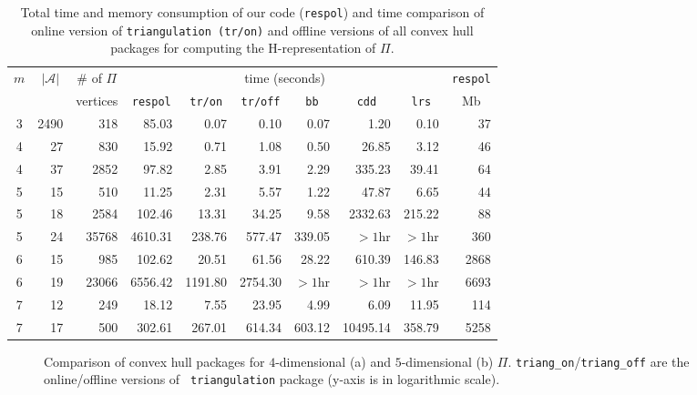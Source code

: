 \documentclass{article}
\def\A{{\mathcal A}} \def\R{{\mathcal R}}
\begin{document}
\begin{table*}[t]\footnotesize \centering
\begin{tabular}{@{}crr|rr|rrrr|r}
\multirow{2}{*}{$m$} & 
\multicolumn{1}{c}{\multirow{2}{*}{$|\A|$}} &
\multicolumn{1}{c|}{\# of $\varPi$} &
\multicolumn{6}{c|}{time (seconds)} &
\multicolumn{1}{c}{{\tt respol}} \\
\cline{4-9} & &
\multicolumn{1}{c|}{vertices} &
\multicolumn{1}{c}{{\tt respol}} &
\multicolumn{1}{c|}{{\tt tr/on}} &
\multicolumn{1}{c}{{\tt tr/off}} &
\multicolumn{1}{c}{{\tt bb}} &
\multicolumn{1}{c}{{\tt cdd}} &
\multicolumn{1}{c|}{{\tt lrs}} &
\multicolumn{1}{c}{Mb}\\
\hline
3 & 2490 & 318 & 85.03 & 0.07 & 0.10 & 0.07 & 1.20 & 0.10 & 37 \\
4 & 27 & 830 & 15.92 & 0.71 & 1.08  & 0.50 & 26.85 & 3.12 & 46 \\ 
4 & 37 & 2852 & 97.82 & 2.85 & 3.91  & 2.29 & 335.23 & 39.41 & 64 \\ 
5 & 15 & 510 & 11.25 & 2.31 & 5.57  & 1.22 & 47.87 & 6.65 & 44 \\ 
5 & 18 & 2584 & 102.46 & 13.31 & 34.25 & 9.58 & 2332.63 & 215.22 & 88 \\
5 & 24 & 35768 & 4610.31 & 238.76 & 577.47 & 339.05 & $>1$hr & $>1$hr & 360 \\
6 & 15 & 985 & 102.62 & 20.51 & 61.56 & 28.22 & 610.39 & 146.83 & 2868 \\
6 & 19 & 23066 & 6556.42 & 1191.80 & 2754.30 & $>1$hr & $>1$hr & $>1$hr &
        6693 \\
7 & 12 & 249 & 18.12 & 7.55 & 23.95 & 4.99 & 6.09 & 11.95 & 114 \\
7 & 17 & 500 & 302.61 & 267.01 & 614.34 & 603.12 & 10495.14 & 358.79 &
        5258 \\
\end{tabular}
\caption{Total time and memory consumption of our code ({\tt respol}) and
time comparison of online version 
of {\tt triangulation (tr/on)} and offline versions of all convex hull
packages for
computing the H-representation of $\varPi$.}
\label{tab:CHcompare} \end{table*}

\begin{figure*}[t] \centering
\caption{Comparison of convex hull packages for  $4$-dimensional (a) and
$5$-dimensional (b) $\varPi$. 
{\tt triang\_on}/{\tt triang\_off} are the online/offline versions of {\tt
triangulation} package (y-axis is in logarithmic scale).
\label{fig:CHcompare}}
\end{figure*}
\end{document}

